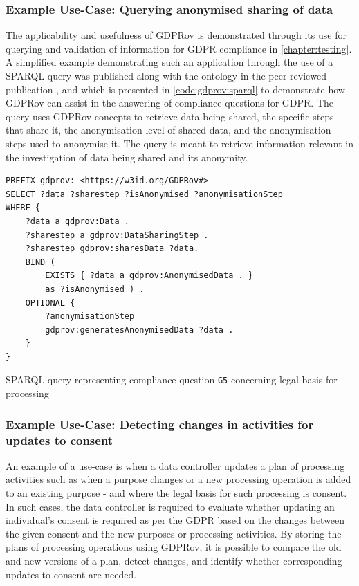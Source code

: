 \subsubsection{Example Use-Case: Querying anonymised sharing of data}
The applicability and usefulness of GDPRov is demonstrated through its use for querying and validation of information for GDPR compliance in \autoref{chapter:testing}.
A simplified example demonstrating such an application through the use of a SPARQL query was published along with the ontology in the peer-reviewed publication \cite{pandit_modelling_2017}, and which is presented in \autoref{code:gdprov:sparql} to demonstrate how GDPRov can assist in the answering of compliance questions for GDPR.
The query uses GDPRov concepts to retrieve data being shared, the specific steps that share it, the anonymisation level of shared data, and the anonymisation steps used to anonymise it. The query is meant to retrieve information relevant in the investigation of data being shared and its anonymity.
\begin{listing}[htbp]
\begin{verbatim}
PREFIX gdprov: <https://w3id.org/GDPRov#>
SELECT ?data ?sharestep ?isAnonymised ?anonymisationStep
WHERE {
    ?data a gdprov:Data .
    ?sharestep a gdprov:DataSharingStep .
    ?sharestep gdprov:sharesData ?data. 
    BIND (
        EXISTS { ?data a gdprov:AnonymisedData . }
        as ?isAnonymised ) .
    OPTIONAL {
        ?anonymisationStep
        gdprov:generatesAnonymisedData ?data .
    }
}
\end{verbatim}
\caption{SPARQL query representing compliance question \texttt{G5} concerning legal basis for processing}
\label{code:gdprov:sparql}
\end{listing}

\subsubsection{Example Use-Case: Detecting changes in activities for updates to consent}
An example of a use-case is when a data controller updates a plan of processing activities such as when a purpose changes or a new processing operation is added to an existing purpose - and where the legal basis for such processing is consent.
In such cases, the data controller is required to evaluate whether updating an individual's consent is required as per the GDPR based on the changes between the given consent and the new purposes or processing activities. By storing the plans of processing operations using GDPRov, it is possible to compare the old and new versions of a plan, detect changes, and identify whether corresponding updates to consent are needed. 

